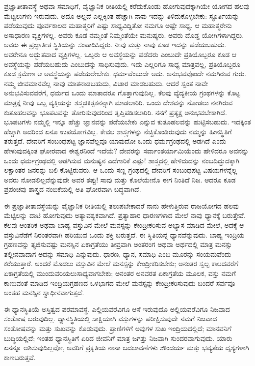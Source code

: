 ಪ್ರಜ್ಞಾತೀತಾವಸ್ಥೆ ಅಥವಾ ಸಮಾಧಿಗೆ, ವೈಜ್ಞಾನಿಕ ರೀತಿಯಲ್ಲಿ ಕರೆದುಕೊಂಡು ಹೋಗುವುದಕ್ಕಾಗಿಯೇ ಯೋಗದ ಹಲವು ಮೆಟ್ಟಲುಗಳು ಇರುವುದು. ಅದೂ ಅಲ್ಲದೆ ಎಲ್ಲಕ್ಕಿಂತ ಹೆಚ್ಚಾಗಿ ನಾವು ಇದನ್ನು ತಿಳಿದುಕೊಳ್ಳಬೇಕು: ಸ್ಫೂರ್ತಿಯನ್ನು ಪಡೆಯುವುದು ಪೂರ್ವಕಾಲದ ಮಹಾತ್ಮರಿಗೆ ಎಷ್ಟು ಸಾಧ್ಯವಿದ್ದಿತೋ ನಮಗೂ ಅಷ್ಟೇ ಸಾಧ್ಯ. ಆ ಮಹಾತ್ಮರೇನು ಅಸಾಧಾರಣ ವ್ಯಕ್ತಿಗಳಲ್ಲ. ಅವರು ಕೂಡ ನಮ್ಮಂತೆ ನಿಮ್ಮಂತೆಯೇ ಮನುಷ್ಯರು. ಅವರು ದೊಡ್ಡ ಯೋಗಿಗಳಾಗಿದ್ದರು. ಅವರು ಈ ಪ್ರಜ್ಞಾತೀತ ಸ್ಥಿತಿಯನ್ನು ಸಂಪಾದಿಸಿದ್ದರು. ನೀವು ಮತ್ತು ನಾವು ಕೂಡ ಇದನ್ನು ಪಡೆಯಬಹುದು. ಅವರೇನೂ ಅದ್ಭುತವಾದ ವ್ಯಕ್ತಿಗಳಲ್ಲ. ಒಬ್ಪರು ಆ ಅವಸ್ಥೆಯನ್ನು ಪಡೆದರು ಎಂಬುದೇ ಪ್ರತಿಯೊಬ್ಬರೂ ಕೂಡ ಆ ಅವಸ್ಥೆಯನ್ನು ಪಡೆಯಬಹುದು ಎಂಬುದನ್ನು ಸಾಧಿಸುವುದು. ಇದು ಎಲ್ಲರಿಗೂ ಸಾಧ್ಯ ಮಾತ್ರವಲ್ಲ, ಪ್ರತಿಯೊಬ್ಬರೂ ಕೂಡ ಕ್ರಮೇಣ ಆ ಅವಸ್ಥೆಯನ್ನು ಪಡೆಯಲೇಬೇಕು. ಧರ್ಮವೆಂಬುದೇ ಅದು. ಅನುಭವವೊಂದೇ ನಮಗಿರುವ ಗುರು. ನಮ್ಮ ಜೀವಮಾನವೆಲ್ಲ ನಾವು ಮಾತನಾಡಬಹುದು, ವಿಚಾರ ಮಾಡಬಹುದು. ಆದರೆ ಸ್ವಂತ ನಾವೇ ಅನುಭವಿಸುವವರೆಗೆ, ಧರ್ಮದ ಒಂದು ಮಾತಾದರೂ ಗೊತ್ತಾಗುವುದಿಲ್ಲ. ಕೆಲವು ವ್ಯೆದ್ಯಕೀಯ ಗ್ರಂಥಗಳನ್ನು ಕೊಟ್ಟ ಮಾತ್ರಕ್ಕೆ ನೀವು ಒಬ್ಬ ವ್ಯಕ್ತಿಯನ್ನು ಶಸ್ತ್ರಚಿಕಿತ್ಸಕನನ್ನಾಗಿ ಮಾಡಲಾರಿರಿ. ಒಂದು ದೇಶವನ್ನು ನೋಡಲು ನನಗಿರುವ ಕುತೂಹಲವನ್ನು ಭೂಪಟವನ್ನು ತೋರಿಸುವುದರಿಂದ ತೃಪ್ತಿಪಡಿಸಲಾರಿರಿ. ನನಗೆ ಪ್ರತ್ಯಕ್ಷ ಅನುಭವಬೇಕಾಗಿದೆ. ಭೂಪಟಗಳು ನಮ್ಮಲ್ಲಿ ಇನ್ನೂ ಹೆಚ್ಚು ಜ್ಞಾನವನ್ನು ಪಡೆಯಬೇಕು ಎನ್ನುವ ಕುತೂಹಲವನ್ನು ಹುಟ್ಟಿಸಬಹುದು. ಇದಕ್ಕಿಂತ ಹೆಚ್ಚಾಗಿ ಅದರಿಂದ ಏನೂ ಉಪಯೋಗವಿಲ್ಲ. ಕೇವಲ ಶಾಸ್ತ್ರಗಳನ್ನು ನೆಚ್ಚಿಕೊಂಡಿರುವುದು ನಮ್ಮನ್ನು ಹೀನಸ್ಥಿತಿಗೆ ತರುತ್ತದೆ. ದೇವರಿಗೆ ಸಂಬಂಧಪಟ್ಟ ಜ್ಞಾನವೆಲ್ಲವೂ ಯಾವುದೋ ಒಂದು ಧರ್ಮಗ್ರಂಥದಲ್ಲಿ ಅಡಗಿದೆ ಎಂದು ಹೇಳುವುದಕ್ಕಿಂತ ಘೋರವಾದ ಈಶ್ವರನಿಂದೆ ಇದೆಯೆ? ದೇವರನ್ನು ಸರ್ವಾಂತರ್ಯಾಮಿಯೆಂದು ಹೇಳಿದರೂ ಅವನನ್ನು ಒಂದು ಧರ್ಮಗ್ರಂಥದಲ್ಲಿ ಅಡಗಿಸುವ ಮನುಷ್ಯನ ಎದೆಗಾರಿಕೆ ಎಷ್ಟು! ಶಾಸ್ತ್ರದಲ್ಲಿ ಹೇಳಿದುದನ್ನು ನಂಬದಿದ್ದುದಕ್ಕಾಗಿ ಲಕ್ಷಾಂತರ ಜನರನ್ನು ಬಲಿ ಕೊಟ್ಟಿರುವರು. ಆ ಒಂದು ಸಣ್ಣ ಗ್ರಂಥದಲ್ಲಿ ದೇವರಿಗೆ ಸಂಬಂಧಪಟ್ಟ ವಿಷಯಗಳನ್ನೆಲ್ಲ ಅವರು ನೋಡಲಿಲ್ಲವೆನ್ನುವುದೇ ಅವರ ತಪ್ಪು! ಸಾವು ಮತ್ತು ಕೊಲೆಯೇನೊ ಈಗ ನಿಂತಿದೆ ನಿಜ. ಆದರೂ ಕೂಡ ಪ್ರಪಂಚವು ಶಾಸ್ತ್ರದ ನಂಬಿಕೆಯಲ್ಲಿ ಅತಿ ಘೋರವಾಗಿ ಬದ್ಧವಾಗಿದೆ. 

ಈ ಪ್ರಜ್ಞಾತೀತಾವಸ್ಥೆಯನ್ನು ವೈಜ್ಞಾನಿಕ ರೀತಿಯಲ್ಲಿ ತಲುಪಬೇಕಾದರೆ ನಾನು ಹೇಳುತ್ತಿರುವ ರಾಜಯೋಗದ ಹಲವು ಮೆಟ್ಟಿಲನ್ನು ದಾಟಿ ಹೋಗುವುದು ಅತ್ಯಾವಶ್ಯಕವಾಗಿದೆ. ಪ್ರತ್ಯಾಹಾರ ಧಾರಣಗಳಾದ ಮೇಲೆ ನಾವು ಧ್ಯಾನಕ್ಕೆ ಬರುತ್ತೇವೆ. ಕೆಲವು ಆಂತರಿಕ ಅಥವಾ ಬಾಹ್ಯ ವಸ್ತುವಿನ ಮೇಲೆ ಮನಸ್ಸನ್ನು ಕೇಂದ್ರೀಕರಿಸುವ ಅಭ್ಯಾಸ ಮಾಡಿದ ಮೇಲೆ, ಅದಕ್ಕೆ ಆ ವಸ್ತುವಿನೆಡೆಗೆ ನಿರಂತರವಾಗಿ ಹರಿಯುವ ಒಂದು ಶಕ್ತಿ ಬರುತ್ತದೆ. ಈ ಸ್ಥಿತಿಯನ್ನೆ ಧ್ಯಾನವೆನ್ನುವುದು. ಬಾಹ್ಯ ಇಂದ್ರಿಯ ಗ್ರಹಣವನ್ನು ತ್ಯಜಿಸುವಷ್ಟು ಮನಸ್ಸಿನ ಏಕಾಗ್ರತೆಯು ತೀವ್ರವಾಗಿ ಅಂತರಂಗ ಅಥವಾ ಅರ್ಥದಲ್ಲಿ ಮಾತ್ರ ಮನಸ್ಸು ತಲ್ಲೀನವಾದಾಗ ಅದನ್ನು ಸಮಾಧಿ ಎನ್ನುವುದು. ಧಾರಣ, ಧ್ಯಾನ, ಸಮಾಧಿ ಎಂಬ ಮೂರನ್ನು ಸಂಯಮವೆಂದು ಕರೆಯುತ್ತಾರೆ. ಅಂದರೆ ಮೊದಲು ವಸ್ತುವಿನ ಮೇಲೆ ಮನಸ್ಸನ್ನು ಕೇಂದ್ರೀಕರಿಸಬೇಕು; ಅನಂತರ ಸ್ವಲ್ಪ ಕಾಲದವರೆಗೆ ಏಕಾಗ್ರತೆಯಲ್ಲಿ ಮುಂದುವರಿಯಲು\break ಸಾಧ್ಯವಾಗಬೇಕು; ಅನಂತರ ಅನವರತ ಏಕಾಗ್ರತೆಯ ಮೂಲಕ, ವಸ್ತು ನಮಗೆ ಕಾಣುವಂತೆ ಮಾಡಿದ ಇಂದ್ರಿಯಗ್ರಹಣದ ಒಳಭಾಗದ ಮೇಲೆ ಮನಸ್ಸನ್ನು ಕೇಂದ್ರೀಕರಿಸುವುದು ಬಂದರೆ ಸರ್ವವೂ ಅಂತಹ ಮನಸ್ಸಿನ ಸ್ವಾಧೀನವಾಗುತ್ತದೆ. 

ಈ ಧ್ಯಾನಸ್ಥಿತಿಯೆ ಅಸ್ತಿತ್ವದ ಪರಮಾವಸ್ಥೆ. ಎಲ್ಲಿಯವರೆವಿಗೂ ಆಸೆ ಇರುವುದೊ ಅಲ್ಲಿಯವರೆವಿಗೂ ನಿಜವಾದ ಸಂತೋಷ ಬರುವುದಿಲ್ಲ. ಧ್ಯಾನಸ್ಥಿತಿಯಲ್ಲಿ ಸಾಕ್ಷಿಯಾಗಿ ವಸ್ತುಗಳನ್ನು ಪರೀಕ್ಷಿಸುವುದೇ ನಮಗೆ ನಿಜವಾದ ಸಂತೋಷವನ್ನು ಮತ್ತು ಸುಖವನ್ನು ಕೊಡುವುದು. ಪ್ರಾಣಿಗಳಿಗೆ ಅವುಗಳ ಸುಖ ಇಂದ್ರಿಯದಲ್ಲಿದೆ; ಮಾನವನಿಗೆ ಬುದ್ಧಿಯಲ್ಲಿದೆ; ಇಂತಹ ಧ್ಯಾನಸ್ಥಿತಿಗೆ ಏರಿದ ಜೀವನಿಗೆ ಮಾತ್ರ ಜಗತ್ತು ನಿಜವಾಗಿ ಸುಂದರವಾಗುವುದು. ಯಾರು ಏನನ್ನೂ ಆಶಿಸುವುದಿಲ್ಲವೋ, ಅವರಿಗೆ ಪ್ರಕೃತಿಯ ನಾನಾ ಬದಲಾವಣೆಗಳು ಸೌಂದರ್ಯ ಮತ್ತು ಭವ್ಯತೆಯ ದೃಶ್ಯಗಳಾಗಿ ಕಾಣಬರುತ್ತವೆ. 

